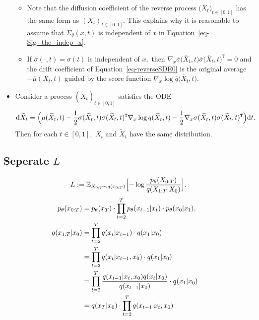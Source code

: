 \documentclass[
]{article}
\theoremstyle{remark}
\begin{document}
\begin{itemize}
  \begin{itemize}
  \item
    Note that the diffusion coefficient of the reverse process
    \(\bigl( \overline{X}_t \bigr)_{t\in [0,1]}\) has the same form as
    \((X_t)_{t\in [0,1]}.\) This explains why it is reasonable to assume
    that \(\Sigma_{\theta}(x,t)\) is independent of \(x\) in
    Equation~\ref{eq-Sig_the_indep_x}.
  \item
    If \(\sigma(\cdot ,t)=\sigma(t)\) is independent of \(x,\) then
    \(\nabla_x  \overline{\sigma} \bigl( \overline{X}_t,t \bigr) \overline{\sigma} \bigl( \overline{X}_t,t \bigr)^{\mathtt{T}}=0\)
    and the drift coefficient of Equation~\ref{eq-reverseSDE0} is the
    original average \(-\overline{\mu}(X_t,t)\) guided by the score
    function
    \(\nabla_{x} \log \overline{q}\bigl( \overline{X}_t,t \bigr).\)
  \end{itemize}
\item
  Consider a process \((\widetilde{X}_t)_{t\in[0,1]}\) satisfies the ODE
  \[
  \begin{aligned}
    \mathrm{d}\widetilde{X}_t 
    = \Bigl( \mu(\widetilde{X}_t, t) 
    - \frac{1}{2} \sigma(\widetilde{X}_t,t) \sigma(\widetilde{X}_t,t)^{\mathtt{T}} \nabla_{x} \log q(\widetilde{X}_t,t) 
    - \frac{1}{2} \nabla_x \sigma(\widetilde{X}_t,t) \sigma(\widetilde{X}_t,t)^{\mathtt{T}} \Bigr) \mathrm{d}t.
  \end{aligned}
  \] Then for each \(t\in [0,1],\) \(X_t\) and \(\widetilde{X}_t\) have
  the same distribution.
\end{itemize}

\subsection{\texorpdfstring{Seperate
\(L\)}{Seperate L}}\label{seperate-l}

\[
\begin{aligned}
  L :=
  \mathbb E_{X_{0:T}\sim q(x_{0:T})} \Bigl[ -\log \frac{p_{\theta}(X_{0:T})}{q(X_{1:T}\vert X_0)} \Bigr].
\end{aligned}
\] \[
\begin{aligned}
  p_{\theta}(x_{0:T}) &= p_{\theta}(x_T) \cdot \prod_{t=2}^T p_{\theta}(x_{t-1}\vert x_t) \cdot  p_{\theta}(x_0\vert x_1) , \cr 
  q(x_{1:T}\vert x_0) &= \prod_{t=2}^{T} q(x_t \vert x_{t-1}) \cdot q(x_1\vert x_0) \cr 
  &= \prod_{t=2}^{T} q(x_t \vert x_{t-1}, x_0) \cdot q(x_1\vert x_0) \cr 
  &= \prod_{t=2}^{T} \frac{q(x_{t-1} \vert x_{t}, x_0) q(x_t\vert x_0) }{q(x_{t-1}\vert x_0)} \cdot q(x_1\vert x_0) \cr 
  &= q(x_T\vert x_0) \cdot \prod_{t=2}^{T} q(x_{t-1} \vert x_{t}, x_0)
\end{aligned}
\]
\end{document}
